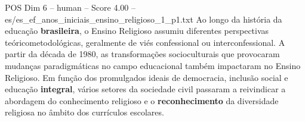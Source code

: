 \begin{textsample}{POS Dim 6 – human – Score 4.00 – es/es\_ef\_anos\_iniciais\_ensino\_religioso\_1\_p1.txt}  \label{ex:f6_pos_005}
Ao longo da história da educação \textbf{brasileira}, o Ensino Religioso assumiu diferentes perspectivas teóricometodológicas, geralmente de viés confessional ou interconfessional.
A partir da década de 1980, as transformações socioculturais que provocaram mudanças paradigmáticas no campo educacional também impactaram no Ensino Religioso.
Em função dos promulgados ideais de democracia, inclusão social e educação \textbf{integral}, vários setores da sociedade civil passaram a reivindicar a abordagem do conhecimento religioso e o \textbf{reconhecimento} da diversidade religiosa no âmbito dos currículos escolares.

\end{textsample}
